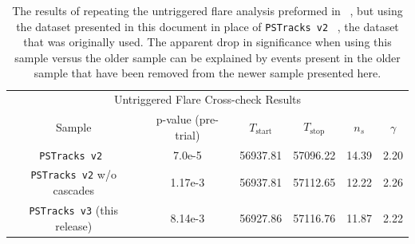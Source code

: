 \documentclass[aps,10pt,prd,twocolumn,floats,letterpaper,showpacs,nofootinbib,bibnotes,notitlepage,superscriptaddress,floatfix]{revtex4-1}
\newcommand{\MA}[1]{{\color{magenta}#1}}
\begin{document}
\begin{table}[p]
\centering
\begin{ruledtabular}
\begin{tabular}{cccccc}
\multicolumn{6}{c}{Untriggered Flare Cross-check Results} \\[0.1cm]
Sample & p-value (pre-trial) & $T_\text{start}$ & $T_\text{stop}$ & $n_s$ & $\gamma$ \\ 
\MA{\tt PSTracks v2}~\cite{IceCube:2018cha,IceCube:2019} & 7.0e-5 & 56937.81 & 57096.22 & 14.39 & 2.20  \\
\MA{\tt PSTracks v2} w/o cascades & 1.17e-3 & 56937.81 & 57112.65 & 12.22 & 2.26 \\
\MA{\tt PSTracks v3} (this release) & 8.14e-3 & 56927.86 & 57116.76 & 11.87 & 2.22\\
\end{tabular}
\end{ruledtabular}
\caption[]{The results of repeating the untriggered flare analysis preformed in ~\cite{IceCube:2018cha}, but using the dataset presented in this document in place of {\tt PSTracks v2} ~\cite{IceCube:2019}, the dataset that was originally used. The apparent drop in significance when using this sample versus the older sample can be explained by events present in the older sample that have been removed from the newer sample presented here.}\label{tab:TXSCrossChecks}
\end{table}
\end{document}
